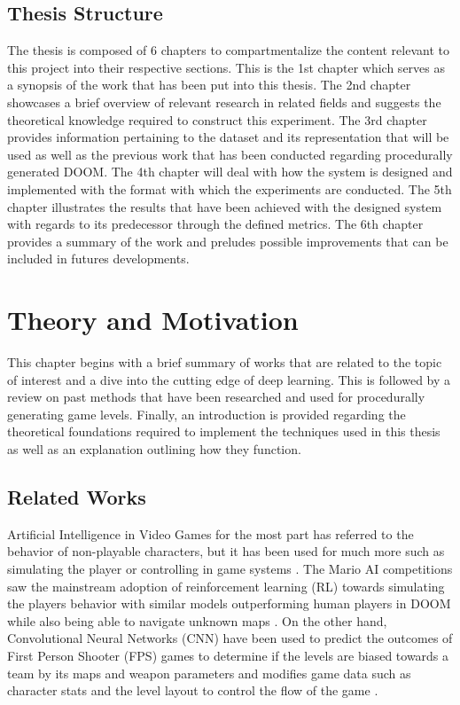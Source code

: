 \documentclass{Configuration_Files/PoliMi3i_thesis}
\begin{document}
\section{Thesis Structure}
The thesis is composed of 6 chapters to compartmentalize the content relevant to this 
project into their respective sections. This is the 1st chapter which serves as a synopsis 
of the work that has been put into this thesis. The 2nd chapter showcases a brief 
overview of relevant research in related fields and suggests the theoretical 
knowledge required to construct this experiment. The 3rd chapter provides 
information pertaining to the dataset and its representation that will be used as well 
as the previous work that has been conducted regarding procedurally generated 
DOOM. The 4th chapter will deal with how the system is designed and implemented
with the format with which the experiments are conducted. The 5th chapter illustrates 
the results that have been achieved with the designed system with regards to its 
predecessor through the defined metrics. The 6th chapter provides a summary of the 
work and preludes possible improvements that can be included in futures 
developments.

\chapter{Theory and Motivation}
\label{ch:theory and motivation}%
This chapter begins with a brief summary of works that are related to the topic of interest 
and a dive into the cutting edge of deep learning. This is followed by a review on past methods 
that have been researched and used for procedurally
generating game levels. Finally, an introduction is provided regarding the theoretical 
foundations required to implement the techniques used in this thesis as well as an explanation 
outlining how they function.

\section{Related Works}
Artificial Intelligence in Video Games for the most part has referred to the behavior 
of non-playable characters, but it has been used for much more such 
as simulating the player or controlling in game systems \cite{JiL20,DaK21}. The 
Mario AI competitions \cite{KaS12} saw the mainstream adoption of reinforcement learning 
(RL) towards simulating the players behavior with similar models outperforming 
human players in DOOM while also being able to navigate unknown maps \cite{GuL16}. 
On the other hand, Convolutional Neural Networks (CNN) have been used to predict the 
outcomes of First Person Shooter (FPS) games to determine if the levels are biased towards a team by its maps 
and weapon parameters and modifies game data such as character stats and the level layout 
to control the flow of the game \cite{DaK21}.
\end{document}
